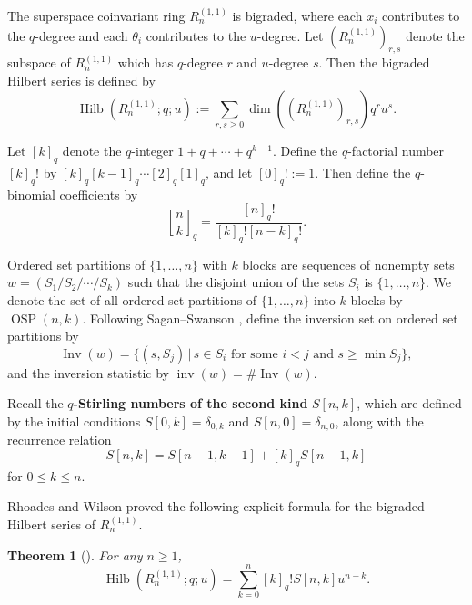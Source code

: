 \documentclass[11pt]{amsart}
\newtheorem{theorem}{Theorem}
\theoremstyle{definition}
\newcommand{\0}{\emptyset}
\DeclareMathOperator{\Hilb}{Hilb}
\DeclareMathOperator{\OSP}{OSP}
\DeclareMathOperator{\inv}{inv}
\DeclareMathOperator{\Inv}{Inv}
\DeclareRobustCommand{\qbinom}{\genfrac[]{0pt}{}}
\begin{document}
The superspace coinvariant ring $R_n^{(1,1)}$ is bigraded, where each $x_i$ contributes to the $q$-degree and each $\theta_i$ contributes to the $u$-degree. 
Let $(R_n^{(1,1)})_{r,s}$ denote the subspace of $R_n^{(1,1)}$ which has $q$-degree $r$ and $u$-degree $s$.
Then the bigraded Hilbert series is defined by 
\begin{equation} \Hilb(R_n^{(1,1)}; q; u) := \sum_{r,s \geq 0}\dim \left((R_n^{(1,1)})_{r,s} \right)q^{r} u^{s}.\end{equation}

Let $[k]_q$ denote the $q$-integer $1+q+\cdots+q^{k-1}$. Define the $q$-factorial number $[k]_q!$ by $[k]_q [k-1]_q \cdots [2]_q [1]_q$, and let $[0]_q! := 1$. Then define the $q$-binomial coefficients by 
\begin{equation}
    \qbinom{n}{k}_q = \frac{[n]_q!}{[k]_q! [n-k]_q!}.
\end{equation}

Ordered set partitions of $\{1,\ldots,n\}$ with $k$ blocks are sequences of nonempty sets $w = (S_1/ S_2/ \cdots / S_k)$ such that the disjoint union of the sets $S_i$ is $\{1,\ldots,n\}$. 
We denote the set of all ordered set partitions of $\{1,\ldots,n\}$ into $k$ blocks by $\OSP(n,k)$.
Following Sagan--Swanson \cite[Section 5.1]{SaganSwanson2024}, define the inversion set on ordered set partitions by
\begin{equation}
    \Inv(w) = \{(s,S_j)\, | \, s \in S_i \text{ for some } i < j \text{ and } s \geq \min S_j\},
\end{equation}
and the inversion statistic by $\inv(w) = \# \Inv(w)$.

Recall the \textbf{$q$-Stirling numbers of the second kind} $S[n,k]$, which are defined by the initial conditions $S[0,k] = \delta_{0,k}$ and $S[n,0] = \delta_{n,0}$, along with the recurrence relation
\begin{equation}\label{eq:stirling}
    S[n,k] = S[n-1,k-1] + [k]_q S[n-1,k]
\end{equation}
for $0 \leq k \leq n$.

Rhoades and Wilson proved the following explicit formula for the bigraded Hilbert series of $R_n^{(1,1)}$.
\begin{theorem}[\!\!\cite{RhoadesWilson2023}]\label{thm:hilbert}
    For any $n \geq 1$,
    \begin{equation}\label{eq:hilbert-rhoades-wilson}
        \Hilb(R_n^{(1,1)};q;u) = \sum_{k=0}^n [k]_q!S[n,k] u^{n-k}.
    \end{equation}
\end{theorem}
\end{document}
